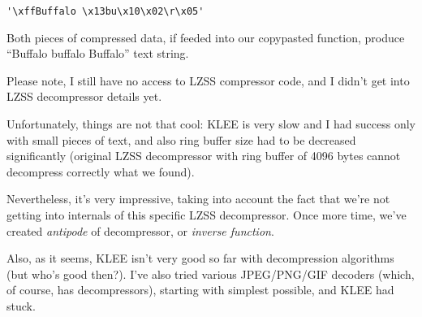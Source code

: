 \begin{lstlisting}
'\xffBuffalo \x13bu\x10\x02\r\x05'
\end{lstlisting}

Both pieces of compressed data, if feeded into our copypasted function, produce ``Buffalo buffalo Buffalo'' text string.

Please note, I still have no access to \ac{LZSS} compressor code, and I didn't get into \ac{LZSS} decompressor details yet.

Unfortunately, things are not that cool: 
KLEE is very slow and I had success only with small pieces of text, and also ring buffer size had to be decreased significantly
(original \ac{LZSS} decompressor with ring buffer of 4096 bytes cannot decompress correctly what we found).

Nevertheless, it's very impressive, taking into account the fact that we're not getting into internals of this specific LZSS decompressor.
Once more time, we've created \textit{antipode} of decompressor, or \textit{inverse function}.

Also, as it seems, KLEE isn't very good so far with decompression algorithms (but who's good then?).
I've also tried various JPEG/PNG/GIF decoders (which, of course, has decompressors), starting with simplest possible, and KLEE had stuck.

